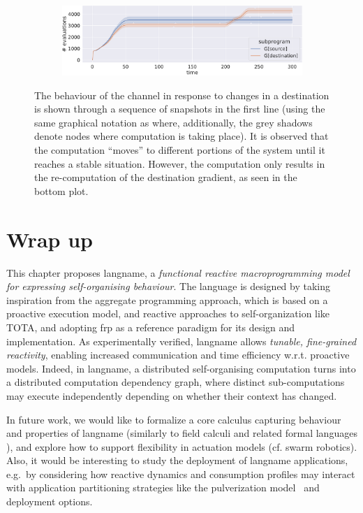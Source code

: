 \begin{figure}
\begin{subfigure}[b]{0.24\linewidth}
      \caption{}
      \label{acsos2023-frp:fig:finish}
  \end{subfigure}\hfill
  \begin{subfigure}[b]{\linewidth}
    \centering
    \includegraphics[width=\textwidth]{papers/acsos2023-frp/imgs/message_count.pdf}
  \end{subfigure}
  \caption[behaviour of the channel in response to changes in a destination]{
  The behaviour of the channel in response to changes in a destination is shown through a sequence of snapshots in the first line (using the same graphical notation as  where, additionally, the grey shadows denote nodes where computation is taking place). 
  It is observed that the computation ``moves'' to different portions of the system until it reaches a stable situation. 
  However, the computation only results in the re-computation of the destination gradient, as seen in the bottom plot.
  }
  \label{acsos2023-frp:fig:subprogram-eval}
\end{figure}

\section{Wrap up}
\label{acsos2023-frp:sec:conc}

This chapter proposes \ac{langname},
 a \emph{functional reactive macroprogramming model
 for expressing self-organising behaviour}.
%
The language is designed by taking inspiration 
 from the aggregate programming approach,
 which is based on a proactive execution model,
 and reactive approaches to self-organization like TOTA,
 and adopting \ac{frp} as a reference paradigm for its design and implementation.
%
As experimentally verified,
 \ac{langname} allows \emph{tunable, fine-grained reactivity},
 enabling increased communication and time efficiency
 w.r.t. proactive models.
%
Indeed, in \ac{langname},
 a distributed self-organising computation
 turns into a distributed computation dependency graph,
 where distinct sub-computations may execute independently 
 depending on whether their context has changed.

In future work,
 we would like to formalize a core calculus capturing behaviour and properties of \ac{langname} (similarly to field calculi and related formal languages \cite{vbdacp:ac:survey:jlamp,DBLP:conf/ecoop/AudritoCDSV22,DBLP:journals/lmcs/AudritoCDV23}),
 and explore how to support flexibility in actuation models (cf. swarm robotics).
Also, it would be interesting 
  to study the deployment of \ac{langname} applications, e.g.\ by considering how reactive dynamics and consumption profiles may interact with application partitioning strategies like the pulverization model~\cite{CPPVW-FI2020} and deployment options.


